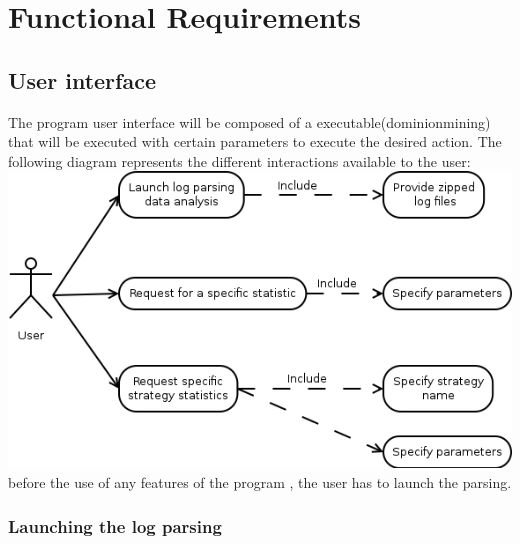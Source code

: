 \documentclass{scrreprt}
\begin{document}
\chapter{Functional Requirements}

\section{User interface}
The program user interface will be composed of a executable(dominionmining) that will be
executed with certain parameters to execute the desired action.
The following diagram represents the different interactions available to the user:\\
\includegraphics[scale=0.45,keepaspectratio]{UseCaseParsing}
before the use of any features of the program , the user has to launch the parsing.
\subsection{Launching the log parsing}
\end{document}
